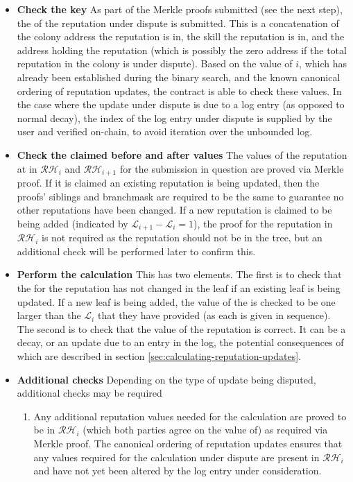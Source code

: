 \begin{itemize}
\item \textbf{Check the key} As part of the Merkle proofs submitted (see the next step), the  of the reputation under dispute is submitted. This is a concatenation of the colony address the reputation is in, the skill the reputation is in, and the address holding the reputation (which is possibly the zero address if the total reputation in the colony is under dispute). Based on the value of $i$, which has already been established during the binary search, and the known canonical ordering of reputation updates, the contract is able to check these values. In the case where the update under dispute is due to a log entry (as opposed to normal decay), the index of the log entry under dispute is supplied by the user and verified on-chain, to avoid iteration over the unbounded log.
\item \textbf{Check the claimed before and after values} The values of the reputation at  in $\mathcal{RH}_{i}$ and $\mathcal{RH}_{i+1}$ for the submission in question are proved via Merkle proof. If it is claimed an existing reputation is being updated, then the proofs' siblings and branchmask are required to be the same to guarantee no other reputations have been changed. If a new reputation is claimed to be being added (indicated by $\mathcal{L}_{i+1} - \mathcal{L}_i = 1$), the proof for the reputation in $\mathcal{RH}_i$ is not required as the reputation should not be in the tree, but an additional check will be performed later to confirm this.
\item \textbf{Perform the calculation} This has two elements. The first is to check that the  for the reputation has not changed in the leaf if an existing leaf is being updated. If a new leaf is being added, the value of the  is checked to be one larger than the $\mathcal{L}_{i}$ that they have provided (as each  is given in sequence). The second is to check that the value of the reputation is correct. It can be a decay, or an update due to an entry in the log, the potential consequences of which are described in section \ref{sec:calculating-reputation-updates}.
\item \textbf{Additional checks} Depending on the type of update being disputed, additional checks may be required
\begin{enumerate} \item Any additional reputation values needed for the calculation are proved to be in $\mathcal{RH}_{i}$ (which both parties agree on the value of) as required via Merkle proof. The canonical ordering of reputation updates ensures that any values required for the calculation under dispute are present in $\mathcal{RH}_{i}$ and have not yet been altered by the log entry under consideration.

\end{enumerate}
\end{itemize}
